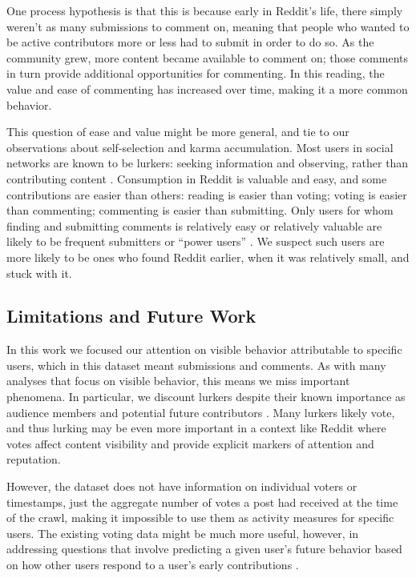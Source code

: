 One process hypothesis is that this is because early in Reddit's life, there simply weren't as many submissions to comment on, meaning that people who wanted to be active contributors more or less had to submit in order to do so. 
As the community grew, more content became available to comment on; those comments in turn provide additional opportunities for commenting.  In this reading, the value and ease of commenting has increased over time, making it a more common behavior. 

This question of ease and value might be more general, and tie to our observations about self-selection and karma accumulation.  Most users in social networks are known to be lurkers: seeking information and observing, rather than contributing content \cite{Rafaeli2004, Nonnecke2000}. Consumption in Reddit is valuable and easy, and some contributions are easier than others: reading is easier than voting; voting is easier than commenting; commenting is easier than submitting.  Only users for whom finding and submitting comments is relatively easy or relatively valuable are likely to be frequent submitters or ``power users'' \cite{Panciera2009, Kittur2007}. We suspect such users are more likely to be ones who found Reddit earlier, when it was relatively small, and stuck with it.

\subsection{Limitations and Future Work}

In this work we focused our attention on visible behavior attributable to specific users, which in this dataset meant submissions and comments.  As with many analyses that focus on visible behavior, this means we miss important phenomena.  In particular, we discount lurkers despite their known importance as audience members \cite{Nonnecke2003} and potential future contributors \cite{Ridings2006}.  Many lurkers likely vote, and thus lurking may be even more important in a context like Reddit where votes affect content visibility and provide explicit markers of attention and reputation.  

However, the dataset does not have information on individual voters or timestamps, just the aggregate number of votes a post had received at the time of the crawl, making it impossible to use them as activity measures for specific users.  The existing voting data might be much more useful, however, in addressing questions that involve predicting a given user's future behavior based on how other users respond to a user's early contributions \cite{Joyce2006,Sarkar2012}.

